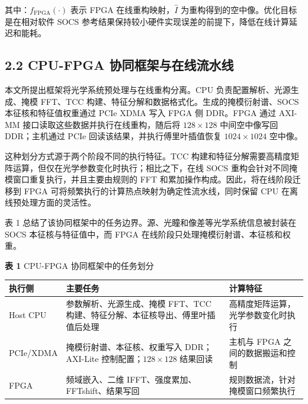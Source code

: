 \documentclass[
  preprint]{elsarticle}
\newcounter{none} %
\begin{document}
其中：\(f_{\mathrm{FPGA}}(\cdot)\) 表示 FPGA 在线重构映射，\(\hat{I}\)
为重构得到的空中像。优化目标是在相对软件 SOCS
参考结果保持较小硬件实现误差的前提下，降低在线计算延迟和能耗。

\subsection{2.2 CPU-FPGA
协同框架与在线流水线}\label{cpu-fpga-ux534fux540cux6846ux67b6ux4e0eux5728ux7ebfux6d41ux6c34ux7ebf}

本文所提出框架将光学系统预处理与在线重构分离。CPU
负责配置解析、光源生成、掩模 FFT、TCC
构建、特征分解和数据格式化。生成的掩模衍射谱、SOCS
本征核和特征值权重通过 PCIe XDMA 写入 FPGA 侧 DDR。FPGA 通过 AXI-MM
接口读取这些数据并执行在线重构，随后将 \(128 \times 128\) 中间空中像写回
DDR；主机通过 PCIe 回读该结果，并执行傅里叶插值恢复 \(1024 \times 1024\)
空中像。

这种划分方式源于两个阶段不同的执行特征。TCC
构建和特征分解需要高精度矩阵运算，但仅在光学参数变化时执行；相比之下，在线
SOCS 重构会针对不同掩模窗口重复执行，并且主要由规则的 FFT
和累加操作构成。因此，将在线阶段迁移到 FPGA
可将频繁执行的计算热点映射为确定性流水线，同时保留 CPU
在离线预处理方面的灵活性。

表 1 总结了该协同框架中的任务边界。源、光瞳和像差等光学系统信息被封装在
SOCS 本征核与特征值中，而 FPGA 在线阶段只处理掩模衍射谱、本征核和权重。

\textbf{表 1} CPU-FPGA 协同框架中的任务划分

{\def\LTcaptype{none} %
\begin{longtable}[]{@{}
  >{\raggedright\arraybackslash}p{}
  >{\raggedright\arraybackslash}p{}
  >{\raggedright\arraybackslash}p{}@{}}
\toprule\noalign{}
\begin{minipage}[b]{\linewidth}\raggedright
执行侧
\end{minipage} & \begin{minipage}[b]{\linewidth}\raggedright
主要任务
\end{minipage} & \begin{minipage}[b]{\linewidth}\raggedright
计算特征
\end{minipage} \\
\midrule\noalign{}
\endhead
\bottomrule\noalign{}
\endlastfoot
Host CPU & 参数解析、光源生成、掩模 FFT、TCC
构建、特征分解、本征核导出、傅里叶插值后处理 &
高精度矩阵运算，光学参数变化时执行 \\
PCIe/XDMA & 掩模衍射谱、本征核、权重写入 DDR；AXI-Lite
控制配置；\(128 \times 128\) 结果回读 & 主机与 FPGA
之间的数据搬运和控制 \\
FPGA & 频域嵌入、二维 IFFT、强度累加、FFTshift、结果写回 &
规则数据流，针对掩模窗口频繁执行 \\
\end{longtable}
}
\end{document}
